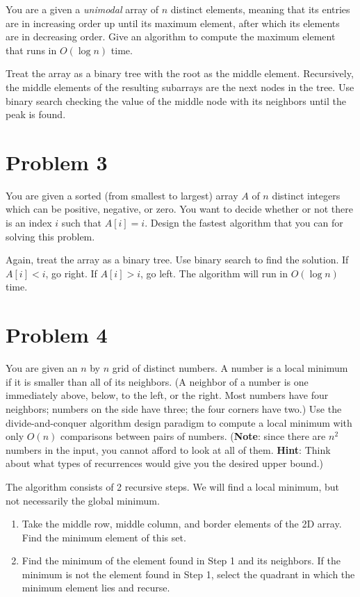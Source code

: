 \documentclass[10pt]{article}
\begin{document}
You are a given a \textit{unimodal} array of $n$ distinct elements, meaning that its entries are in increasing order up until its maximum element, after which its elements are in decreasing order. Give an algorithm to compute the maximum element that runs in $O(\log n)$ time.
\bigskip

Treat the array as a binary tree with the root as the middle element. Recursively, the middle elements of the resulting subarrays are the next nodes in the tree. Use binary search checking the value of the middle node with its neighbors until the peak is found.

\section*{\normalsize Problem 3}

You are given a sorted (from smallest to largest) array $A$ of $n$ distinct integers which can be positive, negative, or zero. You want to decide whether or not there is an index $i$ such that $A[i] = i$. Design the fastest algorithm that you can for solving this problem.
\bigskip

Again, treat the array as a binary tree. Use binary search to find the solution. If $A[i] < i$, go right. If $A[i] > i$, go left. The algorithm will run in $O(\log n)$ time.

\section*{\normalsize Problem 4}

You are given an $n$ by $n$ grid of distinct numbers. A number is a local minimum if it is smaller than all of its neighbors. (A neighbor of a number is one immediately above, below, to the left, or the right. Most numbers have four neighbors; numbers on the side have three; the four corners have two.) Use the divide-and-conquer algorithm design paradigm to compute a local minimum with only $O(n)$ comparisons between pairs of numbers. (\textbf{Note}: since there are $n^2$ numbers in the input, you cannot afford to look at all of them. \textbf{Hint}: Think about what types of recurrences would give you the desired upper bound.)
\bigskip

The algorithm consists of 2 recursive steps. We will find a local minimum, but not necessarily the global minimum.

\begin{enumerate}
	\item Take the middle row, middle column, and border elements of the 2D array. Find the minimum element of this set.
	\item Find the minimum of the element found in Step 1 and its neighbors. If the minimum is not the element found in Step 1, select the quadrant in which the minimum element lies and recurse.
\end{enumerate}
\end{document}
